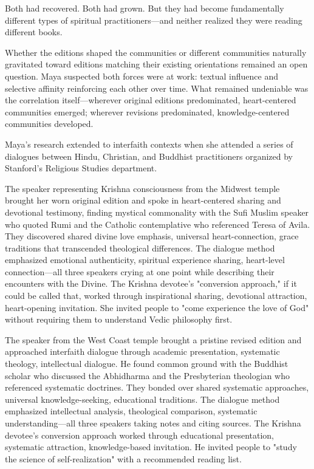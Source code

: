 \documentclass[12pt,twoside]{book}
\begin{document}
Both had recovered. Both had grown. But they had become fundamentally different types of spiritual practitioners—and neither realized they were reading different books.

Whether the editions shaped the communities or different communities naturally gravitated toward editions matching their existing orientations remained an open question. Maya suspected both forces were at work: textual influence and selective affinity reinforcing each other over time. What remained undeniable was the correlation itself—wherever original editions predominated, heart-centered communities emerged; wherever revisions predominated, knowledge-centered communities developed.

Maya's research extended to interfaith contexts when she attended a series of dialogues between Hindu, Christian, and Buddhist practitioners organized by Stanford's Religious Studies department.

The speaker representing Krishna consciousness from the Midwest temple brought her worn original edition and spoke in heart-centered sharing and devotional testimony, finding mystical commonality with the Sufi Muslim speaker who quoted Rumi and the Catholic contemplative who referenced Teresa of Avila. They discovered shared divine love emphasis, universal heart-connection, grace traditions that transcended theological differences. The dialogue method emphasized emotional authenticity, spiritual experience sharing, heart-level connection—all three speakers crying at one point while describing their encounters with the Divine. The Krishna devotee's "conversion approach," if it could be called that, worked through inspirational sharing, devotional attraction, heart-opening invitation. She invited people to "come experience the love of God" without requiring them to understand Vedic philosophy first.

The speaker from the West Coast temple brought a pristine revised edition and approached interfaith dialogue through academic presentation, systematic theology, intellectual dialogue. He found common ground with the Buddhist scholar who discussed the Abhidharma and the Presbyterian theologian who referenced systematic doctrines. They bonded over shared systematic approaches, universal knowledge-seeking, educational traditions. The dialogue method emphasized intellectual analysis, theological comparison, systematic understanding—all three speakers taking notes and citing sources. The Krishna devotee's conversion approach worked through educational presentation, systematic attraction, knowledge-based invitation. He invited people to "study the science of self-realization" with a recommended reading list.
\end{document}
